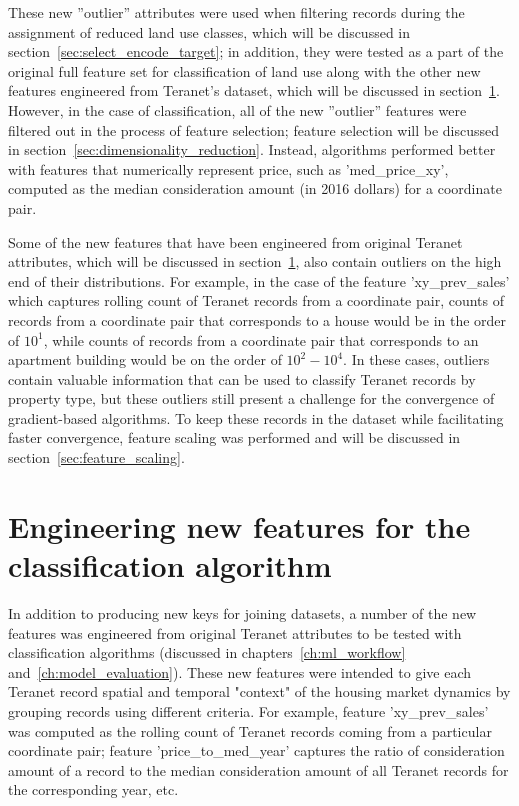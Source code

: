 These new ''outlier'' attributes were used when filtering records during the assignment of reduced land use classes, which will be discussed in section~\ref{sec:select_encode_target};
in addition, they were tested as a part of the original full feature set for classification of land use along with the other new features engineered from Teranet's dataset, which will be discussed in section~\ref{sec:feature_engineering}.
However, in the case of classification, all of the new ''outlier'' features were filtered out in the process of feature selection;
feature selection will be discussed in section~\ref{sec:dimensionality_reduction}.
Instead, algorithms performed better with features that numerically represent price, such as 'med\_price\_xy', computed as the median consideration amount (in 2016 dollars) for a coordinate pair.

Some of the new features that have been engineered from original Teranet attributes, which will be discussed in section~\ref{sec:feature_engineering}, also contain outliers on the high end of their distributions.
For example, in the case of the feature 'xy\_prev\_sales' which captures rolling count of Teranet records from a coordinate pair, counts of records from a coordinate pair that corresponds to a house would be in the order of $10^1$, while counts of records from a coordinate pair that corresponds to an apartment building would be on the order of $10^2-10^4$.
In these cases, outliers contain valuable information that can be used to classify Teranet records by property type, but these outliers still present a challenge for the convergence of gradient-based algorithms.
To keep these records in the dataset while facilitating faster convergence, feature scaling was performed and will be discussed in section~\ref{sec:feature_scaling}.

\section{Engineering new features for the classification algorithm} \label{sec:feature_engineering}

In addition to producing new keys for joining datasets, a number of the new features was engineered from original Teranet attributes to be tested with classification algorithms (discussed in chapters~\ref{ch:ml_workflow} and~\ref{ch:model_evaluation}).
These new features were intended to give each Teranet record spatial and temporal "context" of the housing market dynamics by grouping records using different criteria.
For example, feature 'xy\_prev\_sales' was computed as the rolling count of Teranet records coming from a particular coordinate pair;
feature 'price\_to\_med\_year' captures the ratio of consideration amount of a record to the median consideration amount of all Teranet records for the corresponding year, etc.

